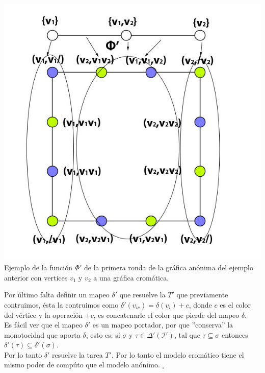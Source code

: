 \documentclass{article}
\begin{document}
\begin{enumerate}
{    \begin{center}
      \includegraphics[scale=0.4]{5_Delta.jpg}
      \\Ejemplo de la función $\Phi'$ de la primera ronda de la gráfica anónima del ejemplo anterior con vertices $v_1$ y $v_2$ a una gráfica cromática.
    \end{center}

    Por último falta definir un mapeo $\delta'$ que resuelve la $T'$ que previamente contruimos, ésta la contruimos como 
    $\delta'(v_{ic}) = \delta(v_{i}) +  c$, donde $c$ es el color del vértice y la operación $+ c$, es concatenarle el color que pierde
    del mapeo $\delta$.\\
    Es fácil ver que el mapeo $\delta'$ es un mapeo portador, por que ''conserva'' la monotocidad que aporta $\delta$, esto es:
    si $\sigma$ y $ \tau \in \Delta'(\mathcal{I}')$, tal que $\tau \subseteq \sigma$ entonces $\delta'(\tau) \subseteq \delta'(\sigma)$.\\

    Por lo tanto $\delta'$ resuelve la tarea $T'$. Por lo tanto el modelo cromático tiene el mismo poder de compúto que el modelo anónimo. $_\square$\\
  }
\end{enumerate}
\end{document}
